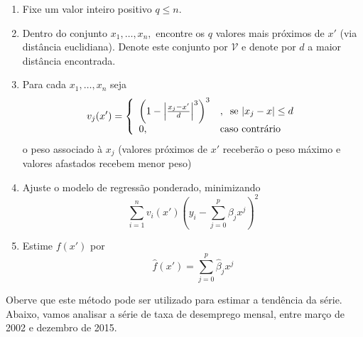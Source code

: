 \documentclass[
  letterpaper,
  DIV=11,
  numbers=noendperiod]{scrartcl}
\newenvironment{Shaded}{\begin{snugshade}}{\end{snugshade}}
\newcommand{\AttributeTok}[1]{\textcolor[rgb]{0.40,0.45,0.13}{#1}}
\newcommand{\DecValTok}[1]{\textcolor[rgb]{0.68,0.00,0.00}{#1}}
\newcommand{\FunctionTok}[1]{\textcolor[rgb]{0.28,0.35,0.67}{#1}}
\newcommand{\NormalTok}[1]{\textcolor[rgb]{0.00,0.23,0.31}{#1}}
\newcommand{\OtherTok}[1]{\textcolor[rgb]{0.00,0.23,0.31}{#1}}
\newcommand{\SpecialCharTok}[1]{\textcolor[rgb]{0.37,0.37,0.37}{#1}}
\newcommand{\StringTok}[1]{\textcolor[rgb]{0.13,0.47,0.30}{#1}}
\theoremstyle{definition}
\theoremstyle{definition}
\theoremstyle{plain}
\theoremstyle{plain}
\theoremstyle{remark}
\begin{document}
\begin{enumerate}
\def\labelenumi{\arabic{enumi}.}
\item
  Fixe um valor inteiro positivo \(q\leq n\).
\item
  Dentro do conjunto \(x_1,\ldots,x_n,\) encontre os \(q\) valores mais
  próximos de \(x'\) (via distância euclidiana). Denote este conjunto
  por \(\mathcal{V}\) e denote por \(d\) a maior distância encontrada.
\item
  Para cada \(x_1,\ldots,x_n\) seja
  \[v_j(x')=\left\{\begin{array}{ll}\left(1-\left| \frac{x_j-x'}{d}\right|^3\right)^3&,\;\;\hbox{se }|x_j-x|\leq d\\ 0,&\hbox{caso contrário}\end{array}\right.\]
  o peso associado à \(x_j\) (valores próximos de \(x'\) receberão o
  peso máximo e valores afastados recebem menor peso)
\item
  Ajuste o modelo de regressão ponderado, minimizando
  \[\sum_{i=1}^n v_i(x')\left(y_i - \sum_{j=0}^p \beta_jx^j\right)^2\]
\item
  Estime \(f(x')\) por \[\hat{f}(x')=\sum_{j=0}^p \hat{\beta}_jx^j \]
\end{enumerate}

Oberve que este método pode ser utilizado para estimar a tendência da
série. Abaixo, vamos analisar a série de taxa de desemprego mensal,
entre março de 2002 e dezembro de 2015.

\begin{Shaded}
\end{Shaded}
\end{document}
